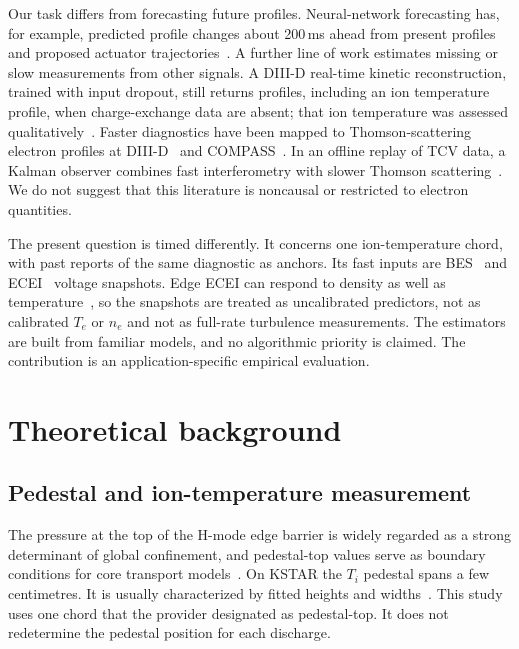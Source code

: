 \documentclass[11pt,a4paper]{article}
\begin{document}
Our task differs from forecasting future profiles. Neural-network forecasting has, for example, predicted profile changes about 200\,ms ahead from present profiles and proposed actuator trajectories~\citep{Abbate2021DatadrivenProfile}. A further line of work estimates missing or slow measurements from other signals. A DIII-D real-time kinetic reconstruction, trained with input dropout, still returns profiles, including an ion temperature profile, when charge-exchange data are absent; that ion temperature was assessed qualitatively~\citep{Shousha2023MachineLearningbased}. Faster diagnostics have been mapped to Thomson-scattering electron profiles at DIII-D~\citep{Jalalvand2025MultimodalSuperresolution} and COMPASS~\citep{Imrek2026TemporalSuperresolution}. In an offline replay of TCV data, a Kalman observer combines fast interferometry with slower Thomson scattering~\citep{Pastore2023ModelBased}. We do not suggest that this literature is noncausal or restricted to electron quantities.

The present question is timed differently. It concerns one ion-temperature chord, with past reports of the same diagnostic as anchors. Its fast inputs are BES~\citep{Lampert2015CombinedHydrogen} and ECEI~\citep{Yun2014Quasi3d} voltage snapshots. Edge ECEI can respond to density as well as temperature~\citep{Vanovac2018EffectsDensity}, so the snapshots are treated as uncalibrated predictors, not as calibrated $T_e$ or $n_e$ and not as full-rate turbulence measurements. The estimators are built from familiar models, and no algorithmic priority is claimed. The contribution is an application-specific empirical evaluation.


\section{Theoretical background}
\label{sec:background}

\subsection{Pedestal and ion-temperature measurement}
The pressure at the top of the H-mode edge barrier is widely regarded as a strong determinant of global confinement, and pedestal-top values serve as boundary conditions for core transport models~\citep{Snyder2011FirstPrinciples}. On KSTAR the $T_i$ pedestal spans a few centimetres. It is usually characterized by fitted heights and widths~\citep{Ko2015IonTemperature}. This study uses one chord that the provider designated as pedestal-top. It does not redetermine the pedestal position for each discharge.
\end{document}
